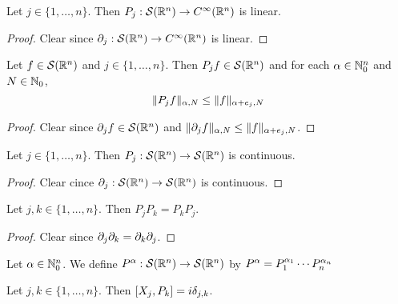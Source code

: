 \documentclass{book}
\begin{document}
	\begin{ex} 
		Let $j \in \{1, \ldots, n\}$. Then $P_j: \mathcal{S}(\mathbb{R}^n) \rightarrow C^{\infty}(\mathbb{R}^n)$ is linear. 
	\end{ex}

	\begin{proof}
		Clear since $\partial_j: \mathcal{S}(\mathbb{R}^n) \rightarrow C^{\infty}(\mathbb{R}^n)$ is linear.
	\end{proof}

	\begin{ex} 
		Let $f \in \mathcal{S}(\mathbb{R}^n)$ and $j \in \{1, \ldots, n\}$. Then $P_jf \in \mathcal{S}(\mathbb{R}^n)$ and for each $\alpha \in \mathbb{N}_0^n$ and $N \in \mathbb{N}_0$, 
		\[
		\|P_jf \|_{\alpha, N} \leq \|f\|_{\alpha + e_j, N}
		\] 
	\end{ex}
	
	\begin{proof}
		Clear since $\partial_j f \in \mathcal{S}(\mathbb{R}^n)$ and $\|\partial_jf \|_{\alpha, N} \leq \|f\|_{\alpha + e_j, N}$.
	\end{proof}

	\begin{ex} 
		Let $j \in \{1, \ldots, n\}$. Then $P_j: \mathcal{S}(\mathbb{R}^n) \rightarrow \mathcal{S}(\mathbb{R}^n)$ is continuous.
	\end{ex}
	
	\begin{proof}
		Clear cince $\partial_j: \mathcal{S}(\mathbb{R}^n) \rightarrow \mathcal{S}(\mathbb{R}^n)$ is continuous.
	\end{proof}

	\begin{ex} 
		Let $j,k \in \{1, \ldots, n\}$. Then $P_jP_k = P_kP_j$.
	\end{ex}
	
	\begin{proof}
		Clear since $\partial_j \partial_k = \partial_k \partial_j$. 
	\end{proof}
	
	\begin{defn}  
		Let $\alpha \in \mathbb{N}_0^n$. We define $P^{\alpha}: \mathcal{S}(\mathbb{R}^n) \rightarrow \mathcal{S}(\mathbb{R}^n)$ by 
		$P^{\alpha} = P_1^{\alpha_1} \cdots P_n^{\alpha_n}$ 
	\end{defn}

	\begin{ex} 
		Let $j, k \in \{1, \ldots, n\}$. Then $[X_j, P_k] = i \delta_{j,k}$.
	\end{ex}
\end{document}
